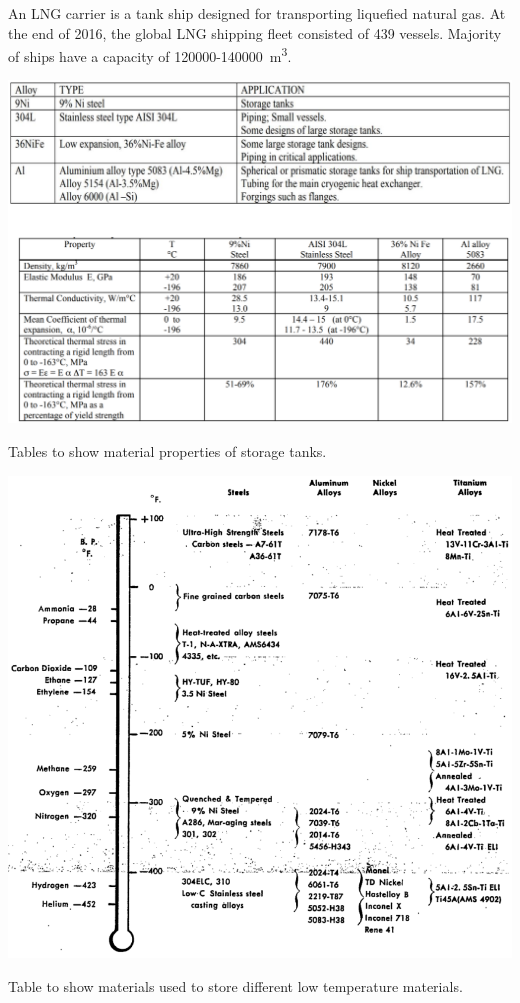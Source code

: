 An LNG carrier is a tank ship designed for transporting liquefied natural gas. At the end of 2016, the global LNG shipping fleet consisted of 439 vessels. Majority of ships have a capacity of \SI{120000}{}-\SI{140000}{\meter\cubed}.
\begin{table}[H]
    \centering
    \includegraphics[width = \textwidth]{img/figure57.png}
    \caption{Tables to show material properties of storage tanks.}
\end{table}
\begin{table}[H]
    \centering
    \includegraphics[width = \textwidth]{img/figure58.png}
    \caption{Table to show materials used to store different low temperature materials.}
\end{table}
